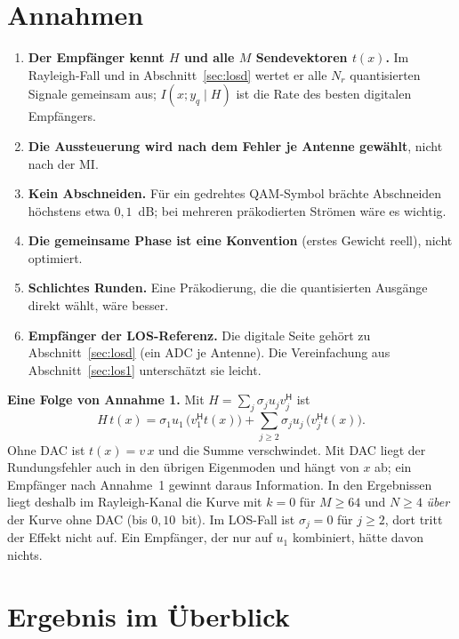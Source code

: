\documentclass[11pt,a4paper]{article}
\begin{document}
\section{Annahmen}\label{sec:annahmen}

\begin{enumerate}[leftmargin=1.6em,itemsep=0.25em]
\item \textbf{Der Empfänger kennt $H$ und alle $M$ Sendevektoren $t(x)$.} Im Rayleigh-Fall und in
Abschnitt~\ref{sec:losd} wertet er alle $N_r$ quantisierten Signale gemeinsam aus; $I(x;y_q\mid H)$ ist die Rate des besten
digitalen Empfängers.
\item \textbf{Die Aussteuerung wird nach dem Fehler je Antenne gewählt}, nicht nach der MI.
\item \textbf{Kein Abschneiden.} Für ein gedrehtes QAM-Symbol brächte Abschneiden höchstens etwa
$0{,}1$~dB; bei mehreren präkodierten Strömen wäre es wichtig.
\item \textbf{Die gemeinsame Phase ist eine Konvention} (erstes Gewicht reell), nicht optimiert.
\item \textbf{Schlichtes Runden.} Eine Präkodierung, die die quantisierten Ausgänge direkt wählt,
wäre besser.
\item \textbf{Empfänger der LOS-Referenz.} Die digitale Seite gehört zu Abschnitt~\ref{sec:losd}
(ein ADC je Antenne). Die Vereinfachung aus Abschnitt~\ref{sec:los1} unterschätzt sie leicht.
\end{enumerate}

\textbf{Eine Folge von Annahme 1.} Mit $H=\sum_j\sigma_ju_jv_j^{\mathsf H}$ ist
\begin{equation}
H\,t(x)=\sigma_1u_1\,\bigl(v_1^{\mathsf H}t(x)\bigr)+\sum_{j\ge2}\sigma_ju_j\,\bigl(v_j^{\mathsf H}t(x)\bigr).
\end{equation}
Ohne DAC ist $t(x)=v\,x$ und die Summe verschwindet. Mit DAC liegt der Rundungsfehler auch in den
übrigen Eigenmoden und hängt von $x$ ab; ein Empfänger nach Annahme~1 gewinnt daraus Information.
In den Ergebnissen liegt deshalb im Rayleigh-Kanal die Kurve mit $k=0$ für $M\ge64$ und $N\ge4$
\emph{über} der Kurve ohne DAC (bis $0{,}10$~bit). Im LOS-Fall ist $\sigma_j=0$ für $j\ge2$, dort
tritt der Effekt nicht auf. Ein Empfänger, der nur auf $u_1$ kombiniert, hätte davon nichts.

\section{Ergebnis im Überblick}\label{sec:erg}
\end{document}
